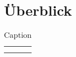\section{Überblick}

\begin{table}[]
\centering
\begin{tabular}{c|c}
 &  \\
 & 
\end{tabular}
\caption{Caption}
\label{tab:my_label}
\end{table}










